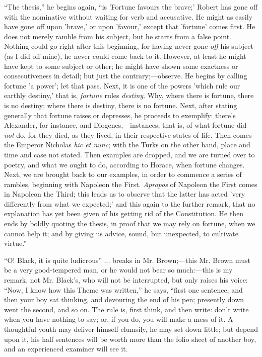 ``The thesis,'' he begins again, ``is 'Fortune favours
the brave;' Robert has gone off with the nominative without
waiting for verb and accusative. He might as easily have gone off upon
'brave,' or upon 'favour,' except that 'fortune' comes first. He does
not merely ramble from his subject, but he starts from a false point.
Nothing could go right after this beginning, for having never gone \emph{off}
his subject (as I did off mine), he never could come back to it.
However, at least he might have kept to some subject or other; he
might have shown some exactness or consecutiveness in detail; but just
the contrary;—observe. He begins by calling fortune 'a power'; let
that pass. Next, it is one of the powers 'which rule our earthly
destiny,' that is, \emph{fortune} rules \emph{destiny}. Why, where
there is fortune, there is no destiny; where there is destiny, there
is no fortune. Next, after stating generally that fortune raises or
depresses, he proceeds to exemplify: there's Alexander, for instance,
and Diogenes,—instances, that is, of what fortune did \emph{not} do,
for they died, as they lived, in their respective states of life. Then
comes the Emperor Nicholas \emph{hic et nunc}; with the Turks on the
other hand, place and time and case not stated. Then examples are
dropped, and we are turned over to poetry, and what we ought to do,
according to Horace, when fortune changes. Next, we are brought back
to our examples, in order to commence a series of rambles, beginning
with Napoleon the First. \emph{Apropos} of Napoleon the First comes in
Napoleon the Third; this leads us to observe that the latter has acted
'very differently from what we expected;' and this again to the
further remark, that no explanation has yet been given of his getting
rid of the Constitution. He then ends by boldly quoting the thesis, in
proof that we may rely on fortune, when we cannot help it; and by
giving us advice, sound, but unexpected, to cultivate virtue.''

``O! Black, it is quite ludicrous'' ... breaks in Mr. Brown;—this Mr. Brown must be a very good-tempered man, or he would
not bear so much:—this is my remark, not Mr. Black's, who will not
be interrupted, but only raises his voice: ``Now, I know how this
Theme was written,'' he says, ``first one sentence, and then
your boy sat thinking, and devouring the end of his pen; presently
down went the second, and so on. The rule is, first think, and then
write: don't write when you have nothing to say; or, if you do, you
will make a mess of it. A thoughtful youth may deliver himself
clumsily, he may set down little; but depend upon it, his half
sentences will be worth more than the folio sheet of another boy, and
an experienced examiner will see it.


